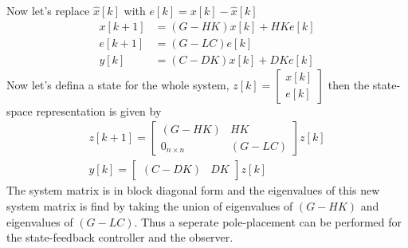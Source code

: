 \documentclass[twoside]{article}
\begin{document}
%
Now let's replace $\hat{x}[k]$ with $e[k] = x[k] - \hat{x}[k]$
%
\begin{align*}
   x[k+1] &= ( G - H K ) x[k] + H K e[k]
  \\
  e[k+1] &= ( G - LC ) e[k]
  \\ 
   y[k] &= (C - D K) x[k] + D K e[k]
\end{align*}
%
Now let's defina a state for the whole system, 
$z[k] = \left[ \begin{array}{c} x[k] \\ e[k] \end{array} \right]$
then the state-space representation is given by
%
\begin{align*}
  z[k+1] = \left[ \begin{array}{cc} (G - H K) & H K\\ 0_{n \times n}
                                              & (G - LC) \end{array}
                                                \right] z[k]
\\
 y[k] = \left[ \begin{array}{cc} (C - DK) & D K \end{array}
                                                \right] z[k]
\end{align*}
%
The system matrix is in block diagonal form and the eigenvalues
of this new system matrix is find by taking the union of eigenvalues
of $(G - H K)$ and eigenvalues of $(G - L C)$. Thus a seperate
pole-placement can be performed for the state-feedback controller
and the observer. 

\end{document}
